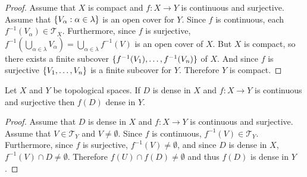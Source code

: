 \documentclass[letterpaper,12pt,fleqn]{article}
\newcommand{\T}{\mathscr{T}}
\renewcommand{\a}{\alpha}
\renewcommand{\l}{\lambda}
\begin{document}
\begin{proof}
  Assume that \(X\) is compact and \(f:X\to Y\) is continuous and surjective.  Assume that \(\set{V_{\a}:\a\in\l}\)
  is an open cover for \(Y\).  Since \(f\) is continuous, each \(f^{-1}(V_{\a})\in\T_X\).  Furthermore, since \(f\)
  is surjective, \(\displaystyle f^{-1}(\bigcup_{\a\in\l}V_{\a})=\bigcup_{\a\in\l}f^{-1}(V)\) is an open cover of \(X\).
  But \(X\) is compact, so there exists a finite subcover \(\{f^{-1}(V_1),\ldots,f^{-1}(V_n)\}\) of \(X\).  And
  since \(f\) is surjective \(\{V_1,\ldots,V_n\}\) is a finite subcover for \(Y\).  Therefore \(Y\) is compact.
\end{proof}

\begin{theorem}
  Let \(X\) and \(Y\) be topological spaces.  If \(D\) is dense in \(X\) and \(f:X\to Y\) is continuous and surjective
  then \(f(D)\) dense in \(Y\).
\end{theorem}

\begin{proof}
  Assume that \(D\) is dense in \(X\) and \(f:X\to Y\) is continuous and surjective.  Assume that \(V\in\T_Y\) and
  \(V\ne\emptyset\).  Since \(f\) is continuous, \(f^{-1}(V)\in\T_Y\).  Furthermore, since \(f\) is surjective,
  \(f^{-1}(V)\ne\emptyset\), and since \(D\) is dense in \(X\), \(f^{-1}(V)\cap D\ne\emptyset\).  Therefore
  \(f(U)\cap f(D)\ne\emptyset\) and thus \(f(D)\) is dense in \(Y\).
\end{proof}
\end{document}

